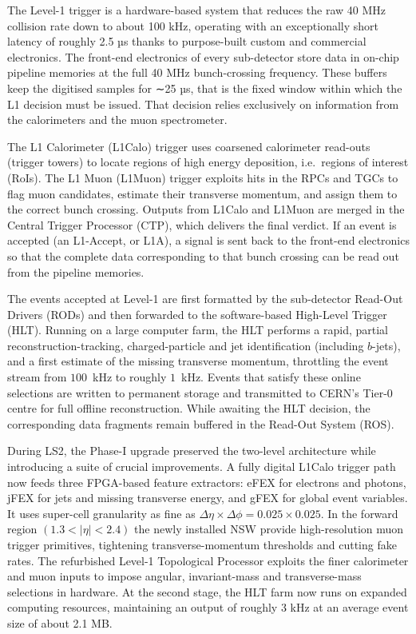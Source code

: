 The Level-1 trigger is a hardware-based system that reduces the raw 40 MHz collision rate down to about 100 kHz, operating with an exceptionally short latency of roughly 2.5 µs thanks to purpose-built custom and commercial electronics. The front-end electronics of every sub-detector store data in on-chip pipeline memories at the full 40 MHz bunch-crossing frequency. These buffers keep the digitised samples for ∼25 µs, that is the fixed window within which the L1 decision must be issued. That decision relies exclusively on information from the calorimeters and the muon spectrometer.

The L1 Calorimeter (L1Calo) trigger uses coarsened calorimeter read-outs (trigger towers) to locate regions of high energy deposition, i.e.\ regions of interest (RoIs). The L1 Muon (L1Muon) trigger exploits hits in the RPCs and TGCs to flag muon candidates, estimate their transverse momentum, and assign them to the correct bunch crossing. Outputs from L1Calo and L1Muon are merged in the Central Trigger Processor (CTP), which delivers the final verdict. If an event is accepted (an L1-Accept, or L1A), a signal is sent back to the front-end electronics so that the complete data corresponding to that bunch crossing can be read out from the pipeline memories.

The events accepted at Level-1 are first formatted by the sub-detector Read-Out Drivers (RODs) and then forwarded to the software-based High-Level Trigger (HLT). Running on a large computer farm, the HLT performs a rapid, partial reconstruction-tracking, charged-particle and jet identification (including $b$-jets), and a first estimate of the missing transverse momentum, throttling the event stream from $100$~kHz to roughly $1$~kHz. Events that satisfy these online selections are written to permanent storage and transmitted to CERN’s Tier-0 centre for full offline reconstruction. While awaiting the HLT decision, the corresponding data fragments remain buffered in the Read-Out System (ROS).

During LS2, the Phase-I upgrade preserved the two-level architecture while introducing a suite of crucial improvements. A fully digital L1Calo trigger path now feeds three FPGA-based feature extractors: eFEX for electrons and photons, jFEX for jets and missing transverse energy, and gFEX for global event variables. It uses super-cell granularity as fine as $\Delta\eta\times\Delta\phi = 0.025\times0.025$. In the forward region $(1.3<|\eta|<2.4)$ the newly installed NSW provide high-resolution muon trigger primitives, tightening transverse-momentum thresholds and cutting fake rates. The refurbished Level-1 Topological Processor exploits the finer calorimeter and muon inputs to impose angular, invariant-mass and transverse-mass selections in hardware. At the second stage, the HLT farm now runs on expanded computing resources, maintaining an output of roughly 3 kHz at an average event size of about 2.1 MB.

